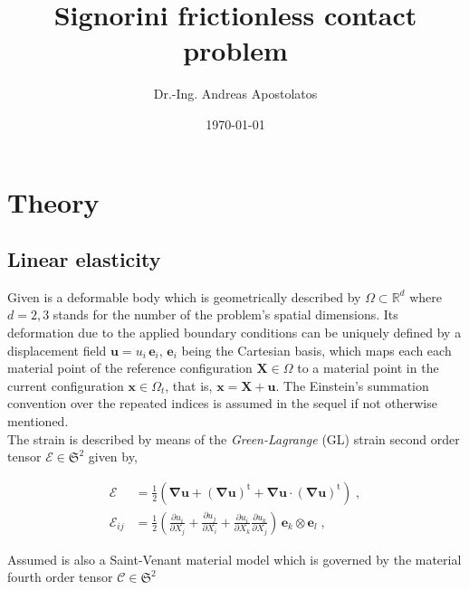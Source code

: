 \documentclass[10pt,a4paper]{article}
\title{Signorini frictionless contact problem}
\author{Dr.-Ing. Andreas Apostolatos}
\date{\today}
\begin{document}
\maketitle

\section{Theory}\label{sec:variational_formulation}

\subsection{Linear elasticity}\label{subsec:linear_elasticity}

Given is a deformable body which is geometrically described by $\Omega \subset \mathbb{R}^d$ where $d = 2,3$ stands for the number of the problem's spatial dimensions. Its deformation due to the applied boundary conditions can be uniquely defined by a displacement field $\mathbf{u} = u_i \, \mathbf{e}_i$, $\mathbf{e}_i$ being the Cartesian basis, which maps each each material point of the reference configuration $\mathbf{X} \in \Omega$ to a material point in the current configuration $\mathbf{x} \in \Omega_t$, that is, $\mathbf{x} = \mathbf{X} + \mathbf{u}$. The Einstein's summation convention over the repeated indices is assumed in the sequel if not otherwise mentioned.\\

The strain is described by means of the \textit{Green-Lagrange} (GL) strain second order tensor $\boldsymbol{\mathcal{E}} \in \mathfrak{S}^2$ given by,

\begin{subequations}
	\begin{alignat}{1}
		\boldsymbol{\mathcal{E}} &= \frac{1}{2} \left( \boldsymbol{\nabla} \mathbf{u} + \left( \boldsymbol{\nabla} \mathbf{u} \right)^{\text{t}} +  \boldsymbol{\nabla} \mathbf{u} \cdot \left( \boldsymbol{\nabla} \mathbf{u} \right)^{\text{t}} \right) \;, \label{eq:GL_strain_tensor} \\
		\mathcal{E}_{ij} &= \frac{1}{2} \left( \frac{\partial u_i}{\partial X_j} + \frac{\partial u_j}{\partial X_i} + \frac{\partial u_i}{\partial X_k} \frac{\partial u_k}{\partial X_j} \right) \, \mathbf{e}_k \otimes \mathbf{e}_l \;, \label{eq:GL_strain_comp}
	\end{alignat}
	\label{eq:GL_strain}
\end{subequations}

Assumed is also a Saint-Venant material model which is governed by the material fourth order tensor $\boldsymbol{\mathcal{C}} \in \mathfrak{S}^2$
\end{document}
